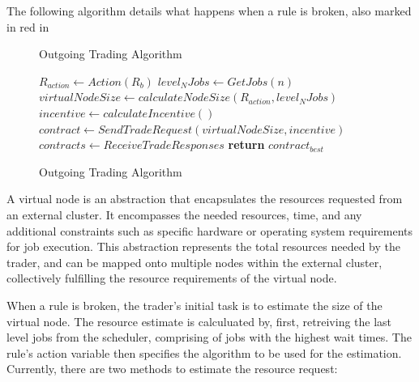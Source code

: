 The following algorithm details what happens when a rule is broken, also marked
in red in  

\begin{figure}[H]
\begin{algorithm}[H]
\caption{Outgoing Trading Algorithm}
\begin{algorithmic}
   
    \State $R_{action} \gets Action(R_b)$
    \State $level_N Jobs \gets GetJobs(n)$ 
    \State $virtualNodeSize \gets calculateNodeSize(R_{action}, level_N Jobs)$
      \State $incentive \gets calculateIncentive()$
    \EndIf
      \State $contract \gets SendTradeRequest(virtualNodeSize, incentive)$
    \EndFor
    \State $contracts \gets ReceiveTradeResponses$ 
    \State \textbf{return} $contract_{best}$
  \EndProcedure
\end{algorithmic}
\end{algorithm}
\caption{Outgoing Trading Algorithm}
\end{figure}

A virtual node is an abstraction that encapsulates the resources requested from
an external cluster. It encompasses the needed resources, time, and any
additional constraints such as specific hardware or operating system
requirements for job execution. This abstraction represents the total resources
needed by the trader, and can be mapped onto multiple nodes within the external
cluster, collectively fulfilling the resource requirements of the virtual node.


When a rule is broken, the trader's initial task is to estimate the size of the
virtual node. The resource estimate is calculuated by, first, retreiving the
last level jobs from the scheduler, comprising of jobs with the highest wait
times. The rule's action variable then specifies the algorithm to be used for
the estimation. Currently, there are two methods to estimate the resource
request:

